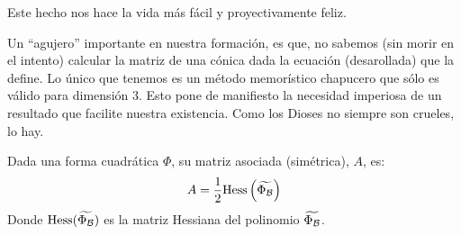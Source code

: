 Este hecho nos hace la vida más fácil y proyectivamente feliz.

Un ``agujero'' importante en nuestra formación, es que, no sabemos (sin morir en el intento) calcular la matriz de una cónica dada la ecuación (desarollada) que la define. Lo único que tenemos es un método memorístico chapucero que sólo es válido para dimensión $3$. Esto pone de manifiesto la necesidad imperiosa de un resultado que facilite nuestra existencia. Como los Dioses no siempre son crueles, lo hay.
\begin{prop}
	\label{C8_prop_Hessiana}
	Dada una forma cuadrática $\Phi$, su matriz asociada (simétrica), $A$, es: \[A=\frac{1}{2}\mathrm{Hess}\left(\widetilde{\Phi_{\mathcal{B}}}\right)\]
	Donde $\mathrm{Hess}(\widetilde{\Phi_{\mathcal{B}}})$ es la matriz Hessiana del polinomio $\widetilde{\Phi_{\mathcal{B}}}$.
\end{prop}
